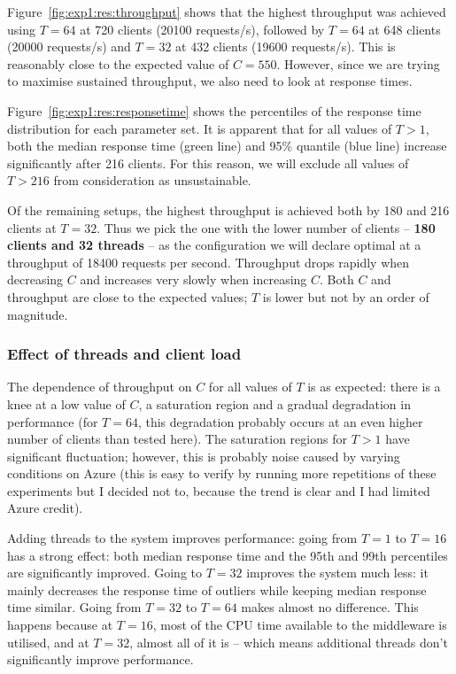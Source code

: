\documentclass[11pt]{article}
\begin{document}
Figure~\ref{fig:exp1:res:throughput} shows that the highest throughput was achieved using $T=64$ at 720 clients (20100 requests/s), followed by $T=64$ at 648 clients (20000 requests/s) and $T=32$ at 432 clients (19600 requests/s). This is reasonably close to the expected value of $C=550$. However, since we are trying to maximise sustained throughput, we also need to look at response times.

Figure~\ref{fig:exp1:res:responsetime} shows the percentiles of the response time distribution for each parameter set. It is apparent that for all values of $T > 1$, both the median response time (green line) and 95\% quantile (blue line) increase significantly after 216 clients. For this reason, we will exclude all values of $T > 216$ from consideration as unsustainable.

Of the remaining setups, the highest throughput is achieved both by 180 and 216 clients at $T=32$. Thus we pick the one with the lower number of clients -- \textbf{180 clients and 32 threads} -- as the configuration we will declare optimal at a throughput of 18400 requests per second. Throughput drops rapidly when decreasing $C$ and increases very slowly when increasing $C$. Both $C$ and throughput are close to the expected values; $T$ is lower but not by an order of magnitude.

\subsubsection{Effect of threads and client load}
The dependence of throughput on $C$ for all values of $T$ is as expected: there is a knee at a low value of $C$, a saturation region and a gradual degradation in performance (for $T=64$, this degradation probably occurs at an even higher number of clients than tested here). The saturation regions for $T>1$ have significant fluctuation; however, this is probably noise caused by varying conditions on Azure (this is easy to verify by running more repetitions of these experiments but I decided not to, because the trend is clear and I had limited Azure credit).

Adding threads to the system improves performance: going from $T=1$ to $T=16$ has a strong effect: both median response time and the 95th and 99th percentiles are significantly improved. Going to $T=32$ improves the system much less: it mainly decreases the response time of outliers while keeping median response time similar. Going from $T=32$ to $T=64$ makes almost no difference. This happens because at $T=16$, most of the CPU time available to the middleware is utilised, and at $T=32$, almost all of it is -- which means additional threads don't significantly improve performance.
\end{document}
